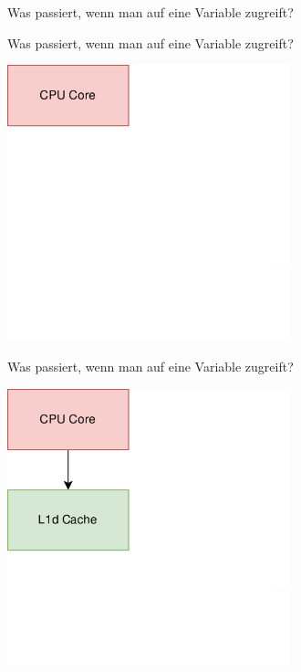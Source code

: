 \documentclass{beamer}
\begin{document}
\begin{frame}
\centering
\Huge
    Was passiert, wenn man auf eine Variable zugreift?
\end{frame}

\begin{frame}{Was passiert, wenn man auf eine Variable zugreift?}
\vspace*{0.5cm}
\centerline{\includegraphics[height=8cm]{trace1.png}}
\end{frame}

\begin{frame}{Was passiert, wenn man auf eine Variable zugreift?}
\vspace*{0.5cm}
\centerline{\includegraphics[height=8cm]{trace2.png}}
\end{frame}
\end{document}
